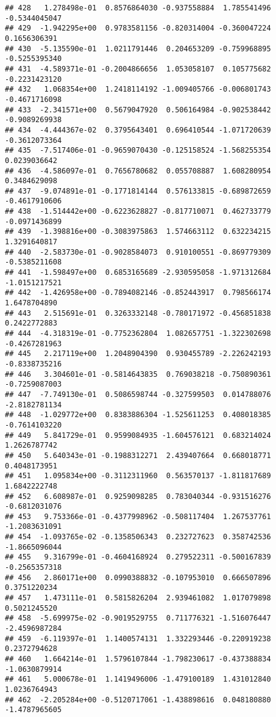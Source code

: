 \documentclass[
]{article}
\begin{document}
\begin{verbatim}
## 428   1.278498e-01  0.8576864030 -0.937558884  1.785541496 -0.5344045047
## 429  -1.942295e+00  0.9783581156 -0.820314004 -0.360047224  0.1656306391
## 430  -5.135590e-01  1.0211791446  0.204653209 -0.759968895 -0.5255395340
## 431  -4.589371e-01 -0.2004866656  1.053058107  0.105775682 -0.2231423120
## 432   1.068354e+00  1.2418114192 -1.009405766 -0.006801743 -0.4671716098
## 433  -2.341571e+00  0.5679047920  0.506164984 -0.902538442 -0.9089269938
## 434  -4.444367e-02  0.3795643401  0.696410544 -1.071720639 -0.3612073364
## 435  -7.517406e-01 -0.9659070430 -0.125158524 -1.568255354  0.0239036642
## 436  -4.586097e-01  0.7656780682  0.055708887  1.608280954  0.3484629098
## 437  -9.074891e-01 -0.1771814144  0.576133815 -0.689872659 -0.4617910606
## 438  -1.514442e+00 -0.6223628827 -0.817710071  0.462733779 -0.0971436899
## 439  -1.398816e+00 -0.3083975863  1.574663112  0.632234215  1.3291640817
## 440  -2.583730e-01 -0.9028584073  0.910100551 -0.869779309 -0.5385211608
## 441  -1.598497e+00  0.6853165689 -2.930595058 -1.971312684 -1.0151217521
## 442  -1.426958e+00 -0.7894082146 -0.852443917  0.798566174  1.6478704890
## 443   2.515691e-01  0.3263332148 -0.780171972 -0.456851838  0.2422772883
## 444  -4.318319e-01 -0.7752362804  1.082657751 -1.322302698 -0.4267281963
## 445   2.217119e+00  1.2048904390  0.930455789 -2.226242193 -0.8338735216
## 446   3.304601e-01 -0.5814643835  0.769038218 -0.750890361 -0.7259087003
## 447  -7.749130e-01  0.5086598744 -0.327599503  0.014788076 -2.8182781134
## 448  -1.029772e+00  0.8383886304 -1.525611253  0.408018385 -0.7614103220
## 449   5.841729e-01  0.9599084935 -1.604576121  0.683214024  1.2626787742
## 450   5.640343e-01 -0.1988312271  2.439407664  0.668018771  0.4048173951
## 451   1.095834e+00 -0.3112311960  0.563570137 -1.811817689  1.6842222748
## 452   6.608987e-01  0.9259098285  0.783040344 -0.931516276 -0.6812031076
## 453   9.753366e-01 -0.4377998962 -0.508117404  1.267537761 -1.2083631091
## 454  -1.093765e-02 -0.1358506343  0.232727623  0.358742536 -1.8665096044
## 455   9.316799e-01 -0.4604168924  0.279522311 -0.500167839 -0.2565357318
## 456   2.860171e+00  0.0990388832 -0.107953010  0.666507896  0.3751220234
## 457   1.473111e-01  0.5815826204  2.939461082  1.017079898  0.5021245520
## 458  -5.699975e-02 -0.9019529755  0.711776321 -1.516076447 -2.4596987284
## 459  -6.119397e-01  1.1400574131  1.332293446 -0.220919238  0.2372794628
## 460   1.664214e-01  1.5796107844 -1.798230617 -0.437388834 -1.0630879914
## 461   5.000678e-01  1.1419496006 -1.479100189  1.431012840  1.0236764943
## 462  -2.205284e+00 -0.5120717061 -1.438898616  0.048180880 -1.4787965605

\end{verbatim}
\end{document}
